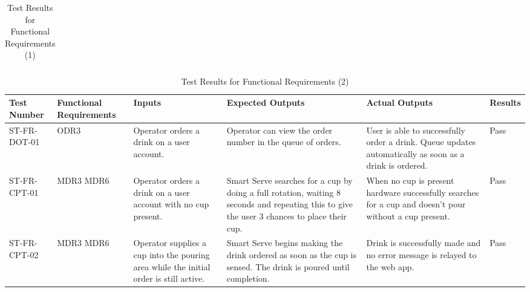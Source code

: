 \documentclass[12pt, titlepage]{article}
\begin{document}
\begin{rotate}{}
\begin{landscape}
\begin{table}
\begin{tabular}{|p{2.75cm}|p{2.5cm}|p{4cm}|p{4.75cm}|p{4.25cm}|p{1.5cm}|}
            \end{tabular}
            \caption{Test Results for Functional Requirements (1)}
            \label{tab: caption}
        \end{table}
     \end{landscape}
    \end{rotate}

    \begin{rotate}{}
    \begin{landscape}
        \begin{table}
           \begin{tabular}{|p{2.75cm}|p{2.5cm}|p{4cm}|p{4.75cm}|p{4.25cm}|p{1.5cm}|}
            \hline
            Test Number & Functional \newline Requirements & Inputs & Expected Outputs & Actual Outputs & Results  \\ [0.5ex]
            \hline\hline
            ST-FR-DOT-01 & ODR3 & Operator orders a drink on a user account. & Operator can view the order number in the queue of orders. & User is able to successfully order a drink. Queue updates automatically as soon as a drink is ordered. & Pass \\
            \hline
            ST-FR-CPT-01 &  MDR3 \newline MDR6 & Operator orders a drink on a user account with no cup present. & Smart Serve searches for a cup by doing a full rotation, waiting 8 seconds and repeating this to give the user 3 chances to place their cup. & When no cup is present hardware successfully searches for a cup and doesn't pour without a cup present. & Pass \\
            \hline
            ST-FR-CPT-02 & MDR3 \newline MDR6 & Operator supplies a cup into the pouring area while the initial order is still active. & Smart Serve begins making the drink ordered as soon as the cup is sensed. The drink is poured until completion. & Drink is successfully made and no error message is relayed to the web app. & Pass \\
            \hline
            \end{tabular}
            \caption{Test Results for Functional Requirements (2)}
            \label{tab: caption}
        \end{table}
     \end{landscape}
    \end{rotate}
\end{document}
